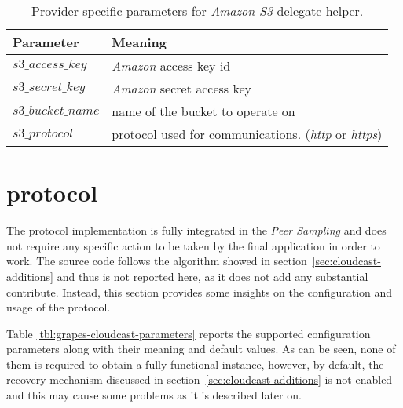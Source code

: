 \begin{table}[H]
  \centering
  \begin{tabular}{|l|l|}
  \hline
  Parameter & Meaning \\
  \hline
  \hline
  $s3\_access\_key$ & \textit{Amazon} access key id \\
  $s3\_secret\_key$ & \textit{Amazon} secret access key \\
  $s3\_bucket\_name$ & name of the bucket to operate on \\
  $s3\_protocol$ & protocol used for communications. (\emph{http}  or
  \emph{https}) \\
  \hline
  \end{tabular}
  \caption{Provider specific parameters for \textit{Amazon S3} delegate helper.}
  \label{tbl:grapes-cloudhelper-libs3}
\end{table}

\section{\cloudcast \peersampling protocol}
The \cloudcast \peersampling protocol implementation is fully
integrated in the \grapes \textit{Peer Sampling} \api and does not
require any specific action to be taken by the final application in
order to work. The source code follows the algorithm showed in
section~\ref{sec:cloudcast-additions} and thus is not reported
here, as it does not add any substantial contribute. Instead, this
section provides some insights on the configuration and usage of the
protocol.

Table \ref{tbl:grapes-cloudcast-parameters} reports the supported
configuration parameters along with their meaning and default
values. As can be seen, none of them is required to obtain a fully
functional instance, however, by default, the recovery mechanism
discussed in section~\ref{sec:cloudcast-additions} is not enabled
and this may cause some problems as it is described later on.


